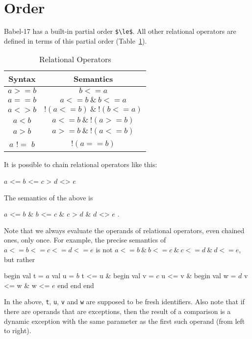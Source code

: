 \documentclass[11pt]{amsart}
\newcommand{\babelsrc}[1] {\lstinline!#1!}
\begin{document}
\section{Order}
Babel-17 has a built-in partial order \babelsrc{$\le$}. All other relational operators are defined in terms of this partial order (Table~\ref{tab:relops}).
\begin{table}
\caption{Relational Operators}
\begin{tabular}{c|c}
\textbf{Syntax} & \textbf{Semantics} \\\hline
$a >= b$ & $b <= a$ \\
$a == b$ & $a <= b\ \&\ b <= a$ \\
$a <> b$ &  $!(a <= b)\ \&\ !(b <= a)$\\
$a < b$ & $a <= b\ \&\ !(a >= b)$ \\
$a > b$ & $a >= b\ \&\ !(a <= b)$ \\
$a$ $!=$ $b$ & $! (a == b)$ \\
\end{tabular}
\label{tab:relops}
\end{table}
It is possible to chain relational operators like this:
\begin{babellisting}
$a$ <= $b$ <= $c$ > $d$ <> $e$ 
\end{babellisting}
The semantics of the above is 
\begin{babellisting}
$a$ <= $b$ & $b$ <= $c$  & $c$ > $d$  & $d$ <> $e$ .
\end{babellisting}
Note that  we always evaluate the operands  of relational operators, even chained ones, only once. For example, the precise semantics of $a <= b <= c <= d <= e$ is not $a <= b\ \&\ b <= c\ \&\  c <= d\ \&\  d <= e$, but rather
\begin{babellisting}
begin
  val t = $a$
  val u = $b$
  t <= u &
  begin
    val v = $c$
    u <= v & 
    begin
      val w = $d$
      v <= w & w <= $e$
    end
  end
end
\end{babellisting}
In the above, \babelsrc{t}, \babelsrc{u}, \babelsrc{v} and \babelsrc{w} are supposed to be fresh identifiers.  Also note that if there are operands that are exceptions, then the result of a comparison is a dynamic exception with the same parameter as the first such operand (from left to right).
\end{document}
